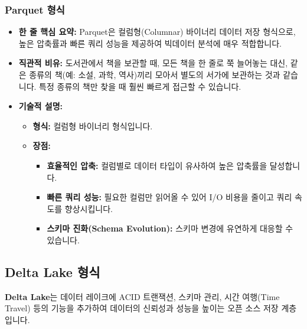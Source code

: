 \documentclass[11pt,a4paper]{article}
\begin{document}
\subsubsection{Parquet 형식}
\begin{itemize}
    \item \textbf{한 줄 핵심 요약:} Parquet은 컬럼형(Columnar) 바이너리 데이터 저장 형식으로, 높은 압축률과 빠른 쿼리 성능을 제공하여 빅데이터 분석에 매우 적합합니다.
    \item \textbf{직관적 비유:} 도서관에서 책을 보관할 때, 모든 책을 한 줄로 쭉 늘어놓는 대신, 같은 종류의 책(예: 소설, 과학, 역사)끼리 모아서 별도의 서가에 보관하는 것과 같습니다. 특정 종류의 책만 찾을 때 훨씬 빠르게 접근할 수 있습니다.
    \item \textbf{기술적 설명:}
    \begin{itemize}
        \item \textbf{형식:} 컬럼형 바이너리 형식입니다.
        \item \textbf{장점:}
        \begin{itemize}
            \item \textbf{효율적인 압축:} 컬럼별로 데이터 타입이 유사하여 높은 압축률을 달성합니다.
            \item \textbf{빠른 쿼리 성능:} 필요한 컬럼만 읽어올 수 있어 I/O 비용을 줄이고 쿼리 속도를 향상시킵니다.
            \item \textbf{스키마 진화(Schema Evolution):} 스키마 변경에 유연하게 대응할 수 있습니다.
        \end{itemize}
    \end{itemize}
\end{itemize}

\subsection{Delta Lake 형식}

\begin{conceptbox}
\textbf{Delta Lake}는 데이터 레이크에 ACID 트랜잭션, 스키마 관리, 시간 여행(Time Travel) 등의 기능을 추가하여 데이터의 신뢰성과 성능을 높이는 오픈 소스 저장 계층입니다.
\end{conceptbox}
\end{document}
